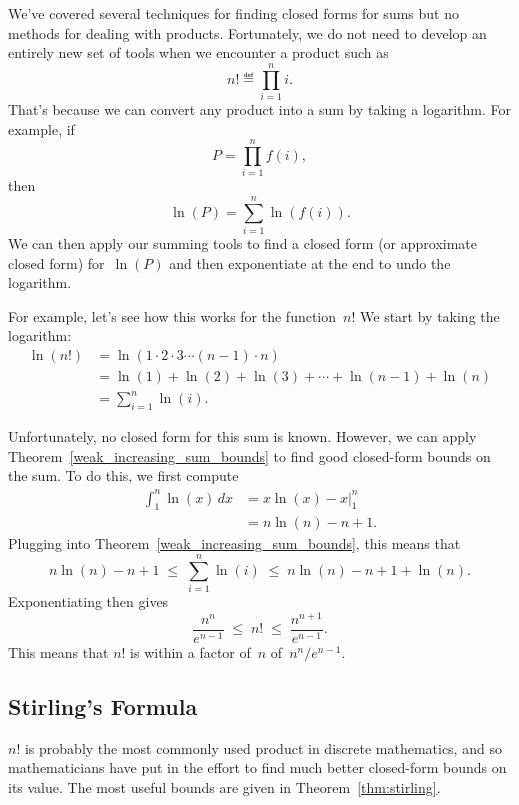 We've covered several techniques for finding closed forms for sums but
no methods for dealing with products.  Fortunately, we do not need to
develop an entirely new set of tools when we encounter a product such
as
\begin{equation}\label{eqn:9P1}
    n! \eqdef \prod_{i = 1}^n i.
\end{equation}
That's because we can convert any product into a sum by taking a
logarithm.  For example, if
\[
    P = \prod_{i  = 1}^n f(i),
\]
then
\[
    \ln(P) = \sum_{i = 1}^n \ln(f(i)).
\]
We can then apply our summing tools to find a closed form (or
approximate closed form) for~$\ln(P)$ and then exponentiate at the end
to undo the logarithm.

For example, let's see how this works for the 
function~$n!$  We start by taking the logarithm:
\begin{align*}
\ln (n!)
       & =  \ln(1 \cdot 2 \cdot 3 \cdots (n-1) \cdot n) \\
       & =  \ln(1) + \ln(2) + \ln(3) + \cdots + \ln(n-1) + \ln(n) \\
       & =  \sum_{i=1}^n \ln(i).
\end{align*}

Unfortunately, no closed form for this sum is known.  However, we can
apply Theorem~\ref{weak_increasing_sum_bounds} to find good
closed-form bounds on the sum.  To do this, we first compute
\begin{align*}
\int_1^n \ln(x) \, dx
    &= x \ln(x) - x \Bigr|_1^n \\
    &= n \ln(n) - n + 1.
\end{align*}
Plugging into Theorem~\ref{weak_increasing_sum_bounds}, this means that
\[
    n \ln(n) - n + 1
    \;\le\; \sum_{i = 1}^n \ln(i)
    \;\le\; n \ln(n) - n + 1 + \ln(n).
\]
Exponentiating then gives
\begin{equation}\label{eqn:9Q1}
    \frac{n^n}{e^{n - 1}} \;\le\; n! \;\le\; \frac{n^{n + 1}}{e^{n - 1}}.
\end{equation}
This means that $n!$ is within a factor of~$n$ of~$n^n/e^{n - 1}$.

\subsection{Stirling's Formula}

$n!$ is probably the most commonly used product in discrete
mathematics, and so mathematicians have put in the effort to find much
better closed-form bounds on its value.  The most useful bounds are
given in Theorem~\ref{thm:stirling}.


